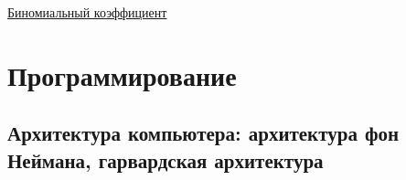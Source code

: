 \documentclass{article}
\begin{document}
\href{https://ru.wikipedia.org/wiki/%D0%91%D0%B8%D0%BD%D0%BE%D0%BC%D0%B8%D0%B0%D0%BB%D1%8C%D0%BD%D1%8B%D0%B9_%D0%BA%D0%BE%D1%8D%D1%84%D1%84%D0%B8%D1%86%D0%B8%D0%B5%D0%BD%D1%82}{Биномиальный коэффициент}


\section{Программирование}
\subsection{Архитектура компьютера: архитектура фон Неймана, гарвардская
архитектура}

\end{document}

